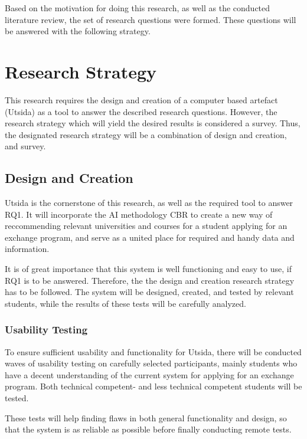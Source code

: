 Based on the motivation for doing this research, as well as the conducted literature review, the set of research questions were formed. These questions will be answered with the following strategy.

\section{Research Strategy}

This research requires the design and creation of a computer based artefact (Utsida) as a tool to answer the described research questions. However, the research strategy which will yield the desired results is considered a survey. Thus, the designated research strategy will be a combination of design and creation, and survey. 

\subsection{Design and Creation}

Utsida is the cornerstone of this research, as well as the required tool to answer RQ1. It will incorporate the AI methodology CBR to create a new way of reccommending relevant universities and courses for a student applying for an exchange program, and serve as a united place for required and handy data and information. 

It is of great importance that this system is well functioning and easy to use, if RQ1 is to be answered. Therefore, the the design and creation research strategy has to be followed. The system will be designed, created, and tested by relevant students, while the results of these tests will be carefully analyzed.

\subsubsection{Usability Testing}

To ensure sufficient usability and functionality for Utsida, there will be conducted waves of usability testing on carefully selected participants, mainly students who have a decent understanding of the current system for applying for an exchange program. Both technical competent- and less technical competent students will be tested.

These tests will help finding flaws in both general functionality and design, so that the system is as reliable as possible before finally conducting remote tests.


